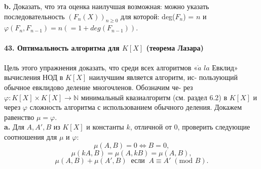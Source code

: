 \documentclass{mai_book}
\begin{document}
\hspace*{10pt}\textbf{b.} Доказать, что эта оценка наилучшая возможная: можно указать\linebreak
последовательность $(F_n(X))_{n\geq0}$ для которой: deg($F_n$) = $n$ и\linebreak
$\varphi(F_n , F_{n-1}) = n (= 1 + deg(F_{n-1}))$.
\\
\\
\noindent\textbf{43. Оптимальность алгоритма для $K[X]$ (теорема Лазара)}\\\\
\hspace*{10pt}Цель этого упражнения доказать, что среди всех алгоритмов «$\grave{a}$ $la$\linebreak
Евклид» вычисления НОД в $K[X]$ наилучшим является алгоритм, ис-\linebreak
пользующий обычное евклидово деление многочленов. Обозначим че-\linebreak
рез $\varphi: K[X] \times K[X] \rightarrow \mathbb{N}$ минимальный квазиалгоритм (см. раздел 6.2)\linebreak
в $K[X]$ и через  $\varphi$ сложность алгоритма с использованием обычного\linebreak
деления. Докажем равенство  $\mu=\varphi$.\\
\hspace*{10pt}\textbf{a.} Для $A, A', B$ из $K[X]$ и константы $k$, отличной от 0, проверить\linebreak
следующие соотношения для $\mu$ и $\varphi$:
\begin{equation*}
\mu(A,B)=0\Leftrightarrow B=0,
\end{equation*}
\begin{equation*}
\mu(kA,B)=\mu(A,kB)=\mu(A,B),
\end{equation*}
\begin{equation*}
\mu(A,B)+\mu(A',B)\;\; \text{если}\;\;A\equiv A'\;(\text{mod }B). 
\end{equation*}\pagebreak

\end{document}
